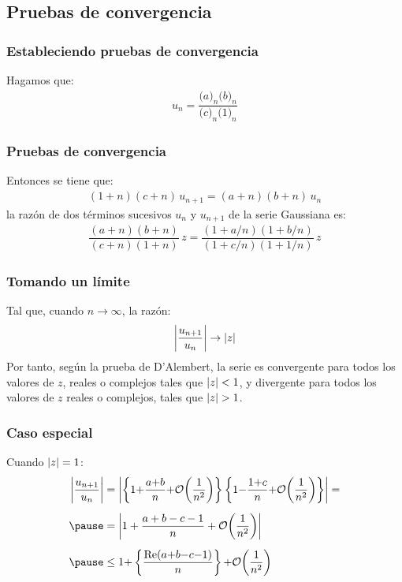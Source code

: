\documentclass[12pt]{beamer}
\begin{document}
\subsection{Pruebas de convergencia}
\begin{frame}
\frametitle{Estableciendo pruebas de convergencia}
Hagamos que:
\pause
\begin{align*}
u_{n} = \dfrac{\big( a \big)_{n} \big( b \big)_{n}}{\big( c \big)_{n} \big( 1 \big)_{n}}
\end{align*}
\end{frame}
\begin{frame}
\frametitle{Pruebas de convergencia}
Entonces se tiene que:
\pause
\begin{align}
(1 + n)(c + n) \, u_{n+1} = (a + n)(b +  n) \, u_{n}
\label{eq:ecuacion_01_01_01_12}
\end{align}
\pause
la razón de dos términos sucesivos $u_{n}$ y $u_{n+1}$ de la serie Gaussiana es:
\pause
\begin{align}
\dfrac{(a + n)(b +  n)}{(c + n)(1 +  n)} \, z = \dfrac{(1 + a/n)(1 + b/n)}{(1 + c/n)(1 + 1/n)} \, z
\label{eq:ecuacion_01_01_01_13}
\end{align}
\end{frame}
\begin{frame}
\frametitle{Tomando un límite}
Tal que, cuando $n \to \infty$, la razón:
\pause
\begin{align*}
\abs{\dfrac{u_{n+1}}{u_{n}}} \to \abs{z}
\end{align*}
\pause
Por tanto, según la prueba de D'Alembert, la serie es convergente para todos los valores de $z$, reales o complejos tales que $\abs{z} < 1$, y divergente para todos los valores de $z$ reales o complejos, tales que $\abs{z} > 1$.
\end{frame}
\begin{frame}
\frametitle{Caso especial}
Cuando $\abs{z} = 1$:
\pause
\begin{eqnarray}
\begin{aligned}[b]
\abs{\dfrac{u_{n+1}}{u_{n}}} &= \abs{\left\{ 1 {+} \dfrac{a {+} b}{n} {+} \order{\dfrac{1}{n^{2}}} \right\} \left\{ 1 {-} \dfrac{1 {+} c}{n} {+} \order{\dfrac{1}{n^{2}}} \right\}} = \\[0.5em] \pause
&= \abs{1 + \dfrac{a + b - c - 1}{n} + \order{\dfrac{1}{n^{2}}}} \\[0.5em] \pause
&\leq 1 {+} \left\{ \dfrac{\Re (a {+} b {-} c {-} 1)}{n} \right\} {+} \order{\dfrac{1}{n^{2}}}
\end{aligned}
\label{eq:eq:ecuacion_01_01_01_14}
\end{eqnarray}
\end{frame}
\end{document}
